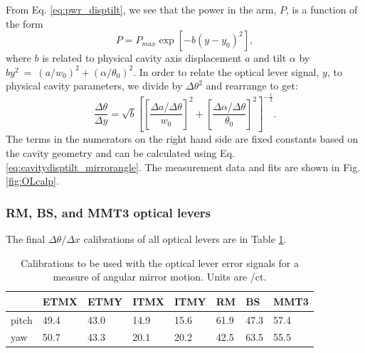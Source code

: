 From Eq. \ref{eq:pwr_disptilt}, we see that the power in the arm, $P$,
is a function of the form 
\begin{equation}
P = P_{max} \exp{[-b (y-y_0)^2]},
\label{eq:OLcalfit}
\end{equation}
where $b$ is related to physical cavity axis displacement $a$ and tilt
$\alpha$ by $by^2~=~(a/w_0)^2+(\alpha/\theta_0)^2$. In order to relate
the optical lever signal, $y$, to physical cavity parameters, we
divide by $\Delta{\theta}^2$ and rearrange to get:
\begin{equation}
\frac{\Delta \theta}{\Delta y} = \sqrt{b} \left[
  \left[\frac{\Delta a/\Delta\theta}{w_0}\right]^2 +
  \left[\frac{\Delta\alpha/\Delta\theta}{\theta_0}\right]^2
\right]^{-\frac{1}{2}} .
\end{equation}
The terms in the numerators on the right hand side are fixed constants
based on the cavity geometry and can be calculated using
Eq. \ref{eq:cavitydisptilt_mirrorangle}. The measurement data and fits
are shown in Fig. \ref{fig:OLcalp}.


\subsubsection{RM, BS, and MMT3 optical levers}

The final $\Delta\theta / \Delta x$ calibrations of all optical levers
are in Table \ref{table:oplevcal}. 

\begin{table}
\centering
\caption[Optical lever calibration results.]{Calibrations to be used
  with the optical lever error signals 
  for a measure of angular mirror motion. Units are \microrad/ct.}
\begin{tabular}{l l l l l l l l}
\hline
        & ETMX & ETMY & ITMX & ITMY & RM & BS & MMT3 \\
\hline
pitch & 49.4 & 43.0 & 14.9 & 15.6 & 61.9 & 47.3 & 57.4 \\
yaw & 50.7 & 43.3 & 20.1 & 20.2 & 42.5 & 63.5 & 55.5 \\
\hline
\end{tabular}
\label{table:oplevcal}
\end{table}



